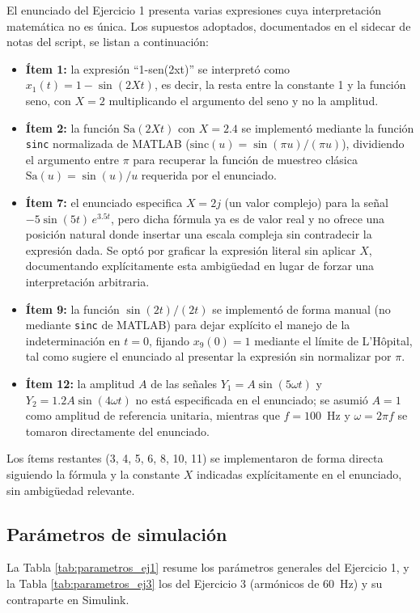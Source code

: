 \documentclass[conference]{IEEEtran}
\begin{document}
El enunciado del Ejercicio 1 presenta varias expresiones cuya interpretación matemática no es única. Los supuestos adoptados, documentados en el sidecar de notas del script, se listan a continuación:
\begin{itemize}
    \item \textbf{Ítem 1:} la expresión ``1-sen(2xt)'' se interpretó como $x_1(t) = 1 - \sin(2Xt)$, es decir, la resta entre la constante 1 y la función seno, con $X=2$ multiplicando el argumento del seno y no la amplitud.
    \item \textbf{Ítem 2:} la función $\text{Sa}(2Xt)$ con $X=2.4$ se implementó mediante la función \texttt{sinc} normalizada de MATLAB ($\text{sinc}(u)=\sin(\pi u)/(\pi u)$), dividiendo el argumento entre $\pi$ para recuperar la función de muestreo clásica $\text{Sa}(u)=\sin(u)/u$ requerida por el enunciado.
    \item \textbf{Ítem 7:} el enunciado especifica $X=2j$ (un valor complejo) para la señal $-5\sin(5t)\,e^{3.5t}$, pero dicha fórmula ya es de valor real y no ofrece una posición natural donde insertar una escala compleja sin contradecir la expresión dada. Se optó por graficar la expresión literal sin aplicar $X$, documentando explícitamente esta ambigüedad en lugar de forzar una interpretación arbitraria.
    \item \textbf{Ítem 9:} la función $\sin(2t)/(2t)$ se implementó de forma manual (no mediante \texttt{sinc} de MATLAB) para dejar explícito el manejo de la indeterminación en $t=0$, fijando $x_9(0)=1$ mediante el límite de L'Hôpital, tal como sugiere el enunciado al presentar la expresión sin normalizar por $\pi$.
    \item \textbf{Ítem 12:} la amplitud $A$ de las señales $Y_1=A\sin(5\omega t)$ y $Y_2=1.2A\sin(4\omega t)$ no está especificada en el enunciado; se asumió $A=1$ como amplitud de referencia unitaria, mientras que $f=100$~Hz y $\omega=2\pi f$ se tomaron directamente del enunciado.
\end{itemize}
Los ítems restantes (3, 4, 5, 6, 8, 10, 11) se implementaron de forma directa siguiendo la fórmula y la constante $X$ indicadas explícitamente en el enunciado, sin ambigüedad relevante.

\subsection{Parámetros de simulación}

La Tabla \ref{tab:parametros_ej1} resume los parámetros generales del Ejercicio 1, y la Tabla \ref{tab:parametros_ej3} los del Ejercicio 3 (armónicos de 60~Hz) y su contraparte en Simulink.
\end{document}
